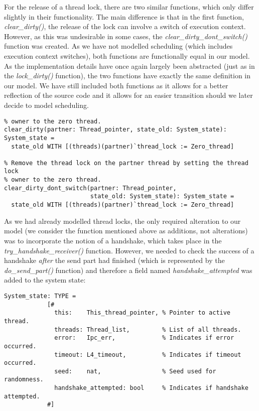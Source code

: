 For the release of a thread lock, there are two similar functions, which only differ slightly in their functionality. The main difference is that in the first function, \emph{clear\_dirty()}, the release of the lock can involve a switch of execution context. However, as this was undesirable in some cases, the \emph{clear\_dirty\_dont\_switch()} function was created. As we have not modelled scheduling (which includes execution context switches), both functions are functionally equal in our model. As the implementation details have once again largely been abstracted (just as in the \emph{lock\_dirty()} function), the two functions have exactly the same definition in our model. We have still included both functions as it allows for a better reflection of the source code and it allows for an easier transition should we later decide to model scheduling.

\lstset{language=PVS}
\begin{lstlisting}[caption={PVS: \emph{clear\_dirty()} and \emph{clear\_dirty\_dont\_switch()} functions.}]
% Remove the thread lock on the partner thread by setting the thread lock
% owner to the zero thread.
clear_dirty(partner: Thread_pointer, state_old: System_state): System_state =
  state_old WITH [(threads)(partner)`thread_lock := Zero_thread]

% Remove the thread lock on the partner thread by setting the thread lock
% owner to the zero thread.
clear_dirty_dont_switch(partner: Thread_pointer, 
                        state_old: System_state): System_state =
  state_old WITH [(threads)(partner)`thread_lock := Zero_thread]
\end{lstlisting}

As we had already modelled thread locks, the only required alteration to our model (we consider the function mentioned above as additions, not alterations) was to incorporate the notion of a handshake, which takes place in the \emph{try\_handshake\_receiver()} function. However, we needed to check the success of a handshake \textit{after} the send part had finished (which is represented by the \emph{do\_send\_part()} function) and therefore a field named \emph{handshake\_attempted} was added to the system state:

\lstset{language=PVS}
\begin{lstlisting}[caption={PVS: basic system state, with integrated \emph{handshake\_attempted} field.}]
System_state: TYPE = 
            [# 
              this:    This_thread_pointer, % Pointer to active thread.
              threads: Thread_list,         % List of all threads.
              error:   Ipc_err,             % Indicates if error occurred.
              timeout: L4_timeout,          % Indicates if timeout occurred.
              seed:    nat,                 % Seed used for randomness.
              handshake_attempted: bool     % Indicates if handshake attempted.
            #]
\end{lstlisting}

